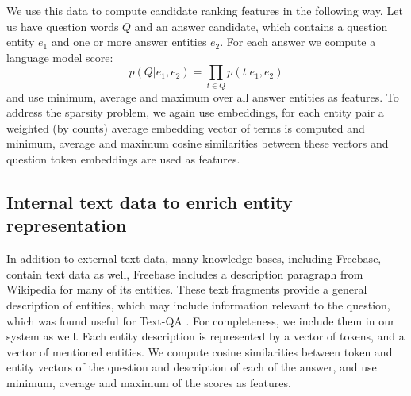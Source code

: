 We use this data to compute candidate ranking features in the following way.
Let us have question words $Q$ and an answer candidate, which contains a question entity $e_1$ and one or more answer entities $e_2$.
For each answer we compute a language model score:
$$p(Q|e_1, e_2) = \prod_{t\in Q} p(t | e_1, e_2)$$
and use minimum, average and maximum over all answer entities as features.
To address the sparsity problem, we again use embeddings, 
\ie for each entity pair a weighted (by counts) average embedding vector of terms is computed and minimum, average and maximum cosine similarities between these vectors and question token embeddings are used as features.

\subsection{Internal text data to enrich entity representation}
In addition to external text data, many knowledge bases, including Freebase, contain text data as well, \eg Freebase includes a description paragraph from Wikipedia for many of its entities.
These text fragments provide a general description of entities, which may include information relevant to the question, which was found useful for Text-QA \cite{Sun:2015:ODQ:2736277.2741651}.
For completeness, we include them in our system as well.
Each entity description is represented by a vector of tokens, and a vector of mentioned entities.
We compute cosine similarities between token and entity vectors of the question and description of each of the answer, and use minimum, average and maximum of the scores as features.
